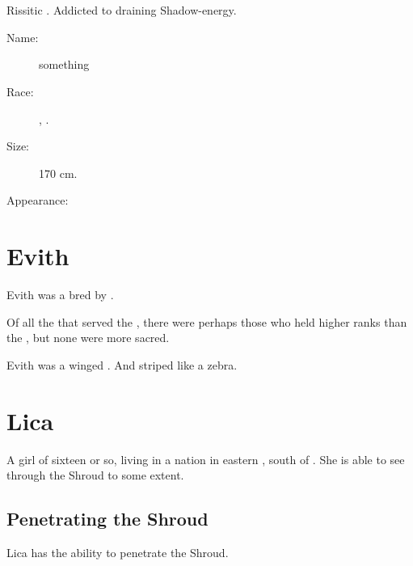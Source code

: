 \section{\Dzerezdin}
Rissitic \Ashenoch{}. Addicted to draining Shadow-energy. 

\begin{description}
  \item[Name:] \Dzerezdin{} something\prikker 
  \item[Race:] \Human, \Ashenoch{}. 
  \item[Size:] 170 cm. 
  \item[Appearance:] 
\end{description}
















\section{Evith}
Evith was a  bred by . 

Of all the \humans{} that served the \resphain, there were perhaps those who held higher ranks than the \naorim, but none were more sacred. 

Evith was a winged . 
And striped like a zebra. 
















\section{Lica}
A \human{} girl of sixteen or so, living in a nation in eastern \Velcad{}, south of \Redce. 
She is able to see through the Shroud to some extent. 









\subsection{Penetrating the Shroud}
Lica has the ability to penetrate the Shroud. 






